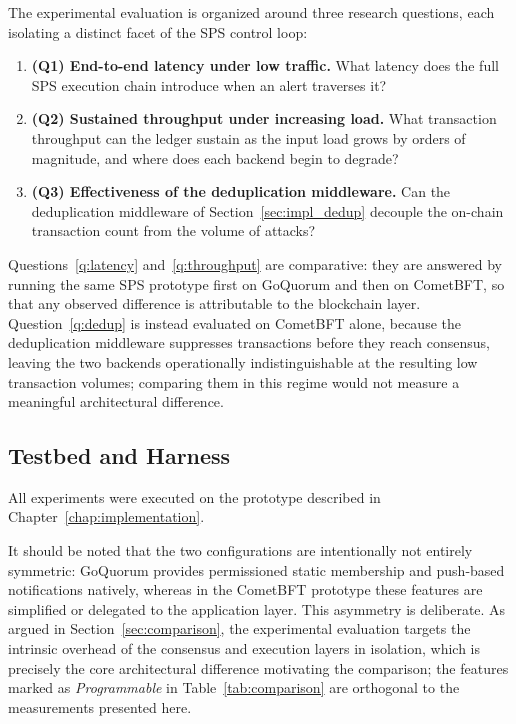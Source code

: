 The experimental evaluation is organized around three research questions, each isolating a distinct facet of the SPS control loop:
\begin{enumerate}
    \item \textbf{(Q1) End-to-end latency under low traffic.} What latency does the full SPS execution chain introduce when an alert traverses it? \label{q:latency}
    \item \textbf{(Q2) Sustained throughput under increasing load.} What transaction throughput can the ledger sustain as the input load grows by orders of magnitude, and where does each backend begin to degrade? \label{q:throughput}
    \item \textbf{(Q3) Effectiveness of the deduplication middleware.} Can the deduplication middleware of Section~\ref{sec:impl_dedup} decouple the on-chain transaction count from the volume of attacks? \label{q:dedup}
\end{enumerate}
Questions~\ref{q:latency} and~\ref{q:throughput} are comparative: they are answered by running the same SPS prototype first on GoQuorum and then on CometBFT, so that any observed difference is attributable to the blockchain layer. Question~\ref{q:dedup} is instead evaluated on CometBFT alone, because the deduplication middleware suppresses transactions before they reach consensus, leaving the two backends operationally indistinguishable at the resulting low transaction volumes; comparing them in this regime would not measure a meaningful architectural difference.

\subsection{Testbed and Harness}
\label{subsec:exp_testbed}

All experiments were executed on the prototype described in Chapter~\ref{chap:implementation}.

It should be noted that the two configurations are intentionally not entirely symmetric: GoQuorum provides permissioned static membership and push-based notifications natively, whereas in the CometBFT prototype these features are simplified or delegated to the application layer. This asymmetry is deliberate. As argued in Section~\ref{sec:comparison}, the experimental evaluation targets the intrinsic overhead of the consensus and execution layers in isolation, which is precisely the core architectural difference motivating the comparison; the features marked as \emph{Programmable} in Table~\ref{tab:comparison} are orthogonal to the measurements presented here.

